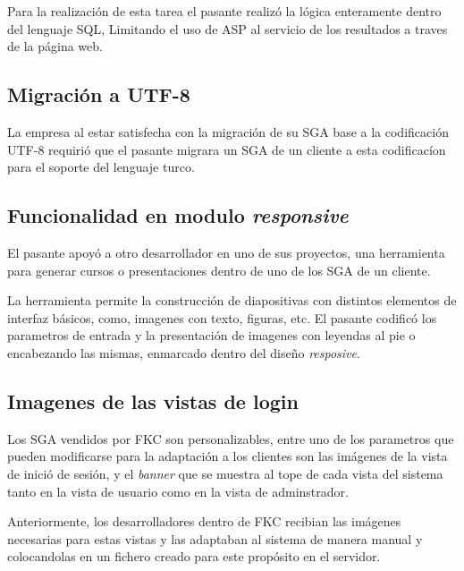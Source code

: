 	Para la realización de esta tarea el pasante realizó la lógica enteramente dentro del lenguaje SQL, Limitando el uso de ASP al servicio de los resultados a traves de la página web.


	\subsection{Migración a UTF-8} %
	\label{sub:migracion_a_utf_8}
	
	La empresa al estar satisfecha con la migración de su SGA base a la codificación UTF-8 requirió que el pasante migrara un SGA de un cliente a esta codificacíon para el soporte del lenguaje turco.

	\subsection{Funcionalidad en modulo \emph{responsive}} %
	\label{sub:funcionalidad_en_modulo_responsive}
	
	El pasante apoyó a otro desarrollador en uno de sus proyectos, una herramienta para generar cursos o presentaciones dentro de uno de los SGA de un cliente.

	La herramienta permite la construcción de diapositivas con distintos elementos de interfaz básicos, como, imagenes con texto, figuras, etc. El pasante codificó los parametros de entrada y la presentación de imagenes con leyendas al pie o encabezando las mismas, enmarcado dentro del diseño \emph{resposive}.


	\subsection{Imagenes de las vistas de login} %
	\label{sub:imagenes_de_las_vistas_de_login}
	
	Los SGA vendidos por FKC son personalizables, entre uno de los parametros que pueden modificarse para la adaptación a los clientes son las imágenes de la vista de inició de sesión, y el \emph{banner} que se muestra al tope de cada vista del sistema tanto en la vista de usuario como en la vista de adminstrador.

	Anteriormente, los desarrolladores dentro de FKC recibian las imágenes necesarias para estas vistas y las adaptaban al sistema de manera manual y colocandolas en un fichero creado para este propósito en el servidor.

